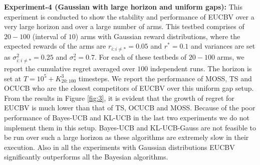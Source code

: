 \textbf{Experiment-4 (Gaussian with large horizon and uniform gaps):} This experiment is conducted to show the stability and performance of EUCBV over a very large horizon and over a large number of arms. This testbed comprises of $20-100$ (interval of $10$) arms with Gaussian reward distributions, where the expected rewards of the arms are $r_{i:i\neq {*}}=0.05$ and $r^{*}=0.1$ and variances are set as $\sigma_{i:i\neq *}^{2}=0.25$ and $\sigma_{*}^{2}=0.7$. For each of these testbeds of $20-100$ arms, we report the cumulative regret averaged over $100$ independent runs. The horizon is set at $T=10^{5} + K_{20:100}^{3}$ timesteps. We report the performance of MOSS, TS and OCUCB who are the closest competitors of EUCBV over this uniform gap setup. From the results in Figure \ref{fig:3}, it is evident that the growth of regret for EUCBV  is much lower than that of TS, OCUCB and MOSS. Because of the poor performance of Bayes-UCB and KL-UCB in the last two experiments we do not implement them in this setup.  Bayes-UCB and KL-UCB-Gauss are not feasible to be run over such a large horizon as these algorithms are extremely slow in their execution. Also in all the experiments with Gaussian distributions EUCBV significantly outperforms all the Bayesian algorithms.


